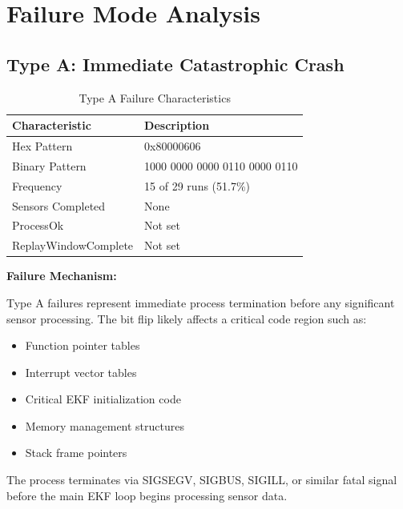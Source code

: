 \documentclass[11pt,a4paper]{article}
\begin{document}
\section{Failure Mode Analysis}

\subsection{Type A: Immediate Catastrophic Crash}

\begin{table}[H]
\centering
\caption{Type A Failure Characteristics}
\label{tab:type_a}
\begin{tabular}{@{}lp{10cm}@{}}
\toprule
\textbf{Characteristic} & \textbf{Description} \\
\midrule
Hex Pattern & 0x80000606 \\
Binary Pattern & 1000 0000 0000 0110 0000 0110 \\
Frequency & 15 of 29 runs (51.7\%) \\
Sensors Completed & None \\
ProcessOk & Not set \\
ReplayWindowComplete & Not set \\
\bottomrule
\end{tabular}
\end{table}

\textbf{Failure Mechanism:}

Type A failures represent immediate process termination before any significant sensor processing. The bit flip likely affects a critical code region such as:

\begin{itemize}
  \item Function pointer tables
  \item Interrupt vector tables
  \item Critical EKF initialization code
  \item Memory management structures
  \item Stack frame pointers
\end{itemize}

The process terminates via SIGSEGV, SIGBUS, SIGILL, or similar fatal signal before the main EKF loop begins processing sensor data.
\end{document}
